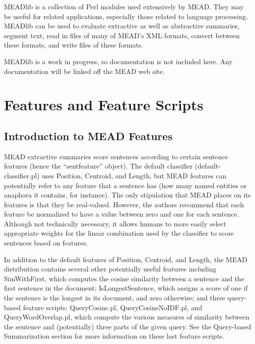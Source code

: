 \documentclass[10pt]{article}
\begin{document}
MEADlib is a collection of Perl modules used extensively by MEAD.
They may be useful for related applications, especially those
related to language processing.  MEADlib can be used to evaluate
extractive as well as abstractive summaries, segment text, 
read in files of many of MEAD's XML formats, convert between 
these formats, and write files of these formats.

MEADlib is a work in progress, 
so documentation is not included here.  Any documentation will be
linked off the MEAD web site.





\section{Features and Feature Scripts}

\subsection{Introduction to MEAD Features}

MEAD extractive summaries score sentences according to certain
sentence features (hence the ``sentfeature'' object).  
The default classifier (default-classifier.pl) uses
Position, Centroid, and Length, but MEAD features can potentially
refer to any feature that a sentence has (how many named entities or
anaphora it contains, for instance).  The only stipulation that MEAD
places on its features is that they be real-valued.  However, the
authors recommend that each feature be normalized to have a value
between zero and one for each sentence.  Although not technically
necessary, it allows humans to more easily select appropriate 
weights for the linear combination used by the classifier to
score sentences based on features.

In addition to the default features of Position, Centroid,
and Length, the MEAD
distribution contains several other potentially useful features
including SimWithFirst, which computes the
cosine similarity between a sentence and the first sentence in the
document; IsLongestSentence, which assigns a score of one if
the sentence is the longest in its document, and zero otherwise; 
and three query-based feature scripts: QueryCosine.pl,
QueryCosineNoIDF.pl, and QueryWordOverlap.pl, which compute the 
various measures of similarity between the sentence and 
(potentially) three parts of the given query.  See the
Query-based Summarization section for more information on these
last feature scripts.
\end{document}
